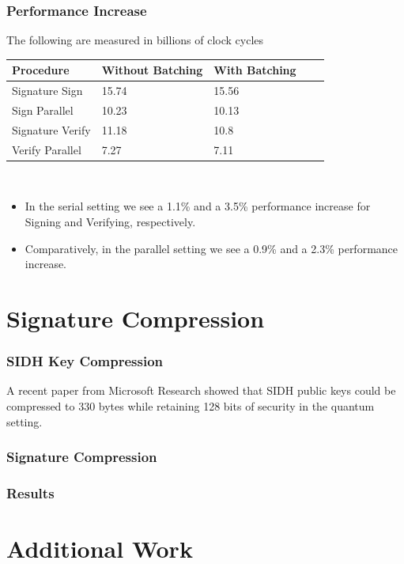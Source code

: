 \documentclass{beamer}
\begin{document}
\begin{frame}[fragile]
\frametitle{Performance Increase}
The following are measured in billions of clock cycles
\begin{center}
\begin{tabular}{@{}lllll@{}}
	\toprule
	Procedure & Without Batching & With Batching\\
	\midrule
	Signature Sign & 15.74 & 15.56\\
	Sign Parallel & 10.23 & 10.13\\
	Signature Verify & 11.18 & 10.8\\
	Verify Parallel & 7.27 & 7.11\\
	\bottomrule
\end{tabular}\\
\end{center}
\begin{itemize}
\item In the serial setting we see a 1.1\% and a 3.5\% performance increase for Signing and Verifying, respectively.
\item Comparatively, in the parallel setting we see a 0.9\% and a 2.3\% performance increase.
\end{itemize}
\end{frame}

\section{Signature Compression}

\begin{frame}
\frametitle{SIDH Key Compression}
A recent paper from Microsoft Research showed that SIDH public keys could be compressed to 330 bytes while retaining 128 bits of security in the quantum setting.  
\end{frame}

\begin{frame}
\frametitle{Signature Compression}
\end{frame}

\begin{frame}
\frametitle{Results}
\end{frame}

\section{Additional Work}

\begin{frame}
\frametitle{}

\begin{center}
\end{center}
\end{frame}
\end{document}

